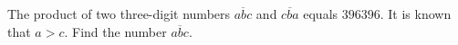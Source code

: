 The product of two three-digit numbers $\overline{abc}$ and $\overline{cba}$ equals $396396$. It is known that $a>c$. Find the number $\overline{abc}$.
